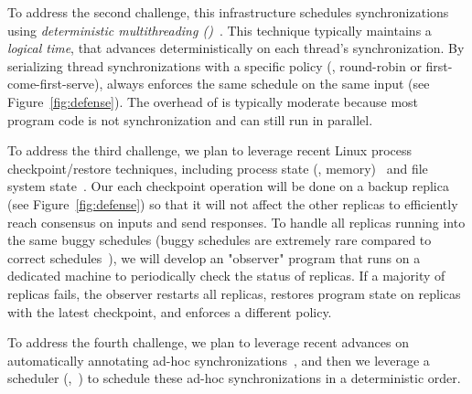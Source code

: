 To address the second challenge, this infrastructure schedules synchronizations 
using \emph{deterministic 
multithreading (\dmt)}~\cite{dpj:oopsla09,dmp:asplos09,kendo:asplos09,
coredet:asplos10, 
dos:osdi10,ddos:asplos13,ics:oopsla13}.  This technique typically maintains a 
\emph{logical time}, that advances deterministically on each thread's 
synchronization. By serializing thread synchronizations with a specific policy 
(\eg, round-robin or first-come-first-serve), \dmt always enforces the 
same schedule on the same input (see Figure~\ref{fig:defense}). The overhead of 
\dmt is typically moderate because most program code is not 
synchronization and can still run in parallel.



To address the third challenge, we plan to leverage recent 
Linux process checkpoint/restore techniques, including process state (\eg, 
memory)~\cite{criu} and file system state~\cite{lxc}. Our each 
checkpoint operation will be done on a backup replica (see 
Figure~\ref{fig:defense}) so that it will not affect the other replicas to 
efficiently reach consensus on inputs and send responses. To handle all replicas 
running into the same buggy schedules (buggy schedules are extremely rare 
compared to correct schedules~\cite{lu:concurrency-bugs}), we will develop an 
"observer" program that runs on a dedicated machine to periodically check the 
status of replicas. If a majority of replicas fails, the observer restarts all 
replicas, restores program state on replicas with the latest checkpoint, and 
enforces a different \dmt policy.

To address the fourth challenge, we plan to leverage recent advances on 
automatically annotating ad-hoc synchronizations~\cite{syncfinder:osdi10, 
cfix:osdi12}, and then we leverage a \dmt scheduler (\eg,~\cite{dthreads:sosp11, 
parrot:sosp13}) to schedule these ad-hoc synchronizations in a deterministic 
order.





